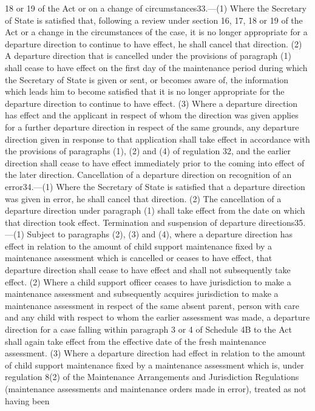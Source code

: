 \documentclass[a4paper]{article}
\begin{document}
18 or 19 of the Act or on a change of circumstances33.—(1) Where the Secretary
of State is satisfied that, following a review under section 16, 17, 18 or 19 of
the Act or a change in the circumstances of the case, it is no longer
appropriate for a departure direction to continue to have effect, he shall
cancel that direction.
(2) A departure direction that is cancelled under the provisions of paragraph
(1) shall cease to have effect on the first day of the maintenance period during
which the Secretary of State is given or sent, or becomes aware of, the
information which leads him to become satisfied that it is no longer appropriate
for the departure direction to continue to have effect.
(3) Where a departure direction has effect and the applicant in respect of whom
the direction was given applies for a further departure direction in respect of
the same grounds, any departure direction given in response to that application
shall take effect in accordance with the provisions of paragraphs (1), (2) and
(4) of regulation 32, and the earlier direction shall cease to have effect
immediately prior to the coming into effect of the later direction.
Cancellation of a departure direction on recognition of an error34.—(1) Where
the Secretary of State is satisfied that a departure direction was given in
error, he shall cancel that direction.
(2) The cancellation of a departure direction under paragraph (1) shall take
effect from the date on which that direction took effect.
Termination and suspension of departure directions35.—(1) Subject to paragraphs
(2), (3) and (4), where a departure direction has effect in relation to the
amount of child support maintenance fixed by a maintenance assessment which is
cancelled or ceases to have effect, that departure direction shall cease to have
effect and shall not subsequently take effect.
(2) Where a child support officer ceases to have jurisdiction to make a
maintenance assessment and subsequently acquires jurisdiction to make a
maintenance assessment in respect of the same absent parent, person with care
and any child with respect to whom the earlier assessment was made, a departure
direction for a case falling within paragraph 3 or 4 of Schedule 4B to the Act
shall again take effect from the effective date of the fresh maintenance
assessment.
(3) Where a departure direction had effect in relation to the amount of child
support maintenance fixed by a maintenance assessment which is, under regulation
8(2) of the Maintenance Arrangements and Jurisdiction Regulations (maintenance
assessments and maintenance orders made in error), treated as not having been
\end{document}
